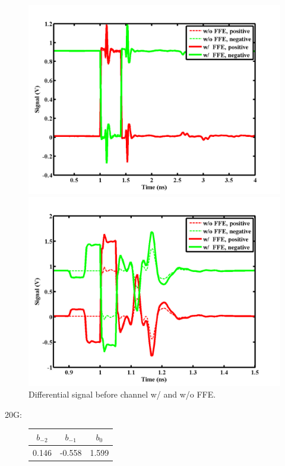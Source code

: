 \documentclass{book}  %
\begin{document}
\begin{paper}
\begin{figure}[htbp!]
	\centering	
	\begin{minipage}[tb]{0.495\textwidth}
		\centering	
		\includegraphics[width=\textwidth]{./img/Verilog/3G/1.png}
	\end{minipage}
	\begin{minipage}[tb]{0.495\textwidth}
		\centering	
		\includegraphics[width=\textwidth]{./img/Verilog/20G/1.png}
	\end{minipage}%
	\caption{Differential signal before channel w/ and w/o FFE.}
\end{figure}


20G: 

\begin{figure}
	\centering	
	\begin{minipage}[tb]{\textwidth}
		\centering	
		\begin{tabular}{|c|c|c|}\hline
			$b_{-2}$ & $b_{-1}$ &  $b_{0}$ \\ \hline 
			0.146 &   -0.558 &    1.599 \\ \hline
		\end{tabular}
		\label{table:20G_FFE_coeff} 
	\end{minipage}%
	

\end{figure}
\end{paper}
\end{document}

